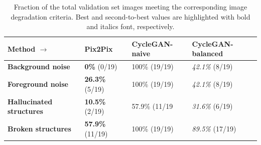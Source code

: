 
\begin{table}[h!]
    \centering
    \begin{tabular}{l || lll}
         \textbf{Method} $\rightarrow$     & Pix2Pix                    & CycleGAN-naive  & CycleGAN-balanced          \\
         \hline
         \textbf{Background noise}         & \textbf{0\%} (0/19)        & 100\% (19/19)   & \textit{42.1\%} (8/19)     \\
         \textbf{Foreground noise}         & \textbf{26.3\%} (5/19)     & 100\% (19/19)   & \textit{42.1\%} (8/19)     \\
         \textbf{Hallucinated structures}  & \textbf{10.5\%} (2/19)     & 57.9\% (11/19   & \textit{31.6\%} (6/19)     \\
         \textbf{Broken structures}        & \textbf{57.9\%} (11/19)    & 100\% (19/19)   & \textit{89.5\%} (17/19)    \\
         
    \end{tabular}
    \caption{Fraction of the total validation set images meeting the corresponding image degradation criteria. Best and second-to-best values are highlighted with bold and italics font, respectively.}
    \label{tab:hx4_image_quality_inspection}
\end{table}


